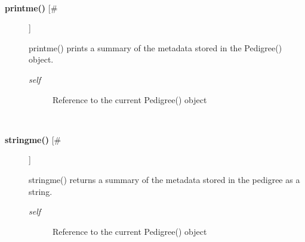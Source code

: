 \documentclass[10pt]{article}
\begin{document}
\begin{description}
\begin{description}
\end{description}
\\ 

\item[\textbf{printme()}
 [\#]]

 printme() prints a summary of the metadata stored in the Pedigree() object.
\begin{description}
\item[\emph{self}
] Reference to the current Pedigree() object

\end{description}
\\ 

\item[\textbf{stringme()}
 [\#]]

 stringme() returns a summary of the metadata stored in the pedigree as a string.
\begin{description}
\item[\emph{self}
] Reference to the current Pedigree() object

\end{description}
\\ 


\end{description}
\end{document}
